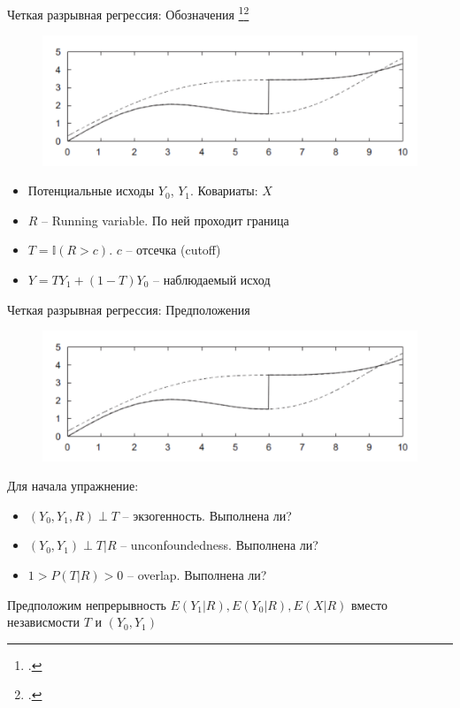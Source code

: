 \begin{frame}{Четкая разрывная регрессия: Обозначения \footcitetext[Картинка из ][]{imbens2008regression}\footcitetext[Также на русском можно почитать][]{quantilerdd}}
    \begin{figure}
        \centering
        \includegraphics[width=\textwidth]{Images/sharp.png}
    \end{figure}
    \begin{itemize}
        \item Потенциальные исходы $Y_0$, $Y_1$. Ковариаты: $X$
        \item $R$ -- Running variable. По ней проходит граница
        \item $T = \mathbb{I}(R > c)$. $c$ -- отсечка (cutoff)
        \item $Y = TY_1 + (1-T)Y_0$ -- наблюдаемый исход
    \end{itemize}
\end{frame}

\begin{frame}{Четкая разрывная регрессия: Предположения}
    \begin{figure}
        \centering
        \includegraphics[width=\textwidth]{Images/sharp.png}
    \end{figure}
    Для начала упражнение:
    \begin{itemize}[<+->]
    \item $(Y_0, Y_1, R) \perp T$ -- экзогенность. Выполнена ли? 
        \item $(Y_0, Y_1) \perp T | R$ -- unconfoundedness. Выполнена ли? 
        \item $1 > P(T | R) > 0$ -- overlap. Выполнена ли? 
    \end{itemize}
    \pause
    Предположим непрерывность $E(Y_1|R), E(Y_0|R), E(X|R)$ вместо независмости $T$ и $(Y_0, Y_1)$
\end{frame}



